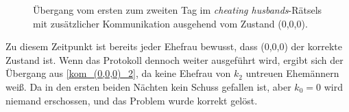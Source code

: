 \begin{figure}
	\caption{Übergang vom ersten zum zweiten Tag im \textit{cheating husbands}-Rätsels mit zusätzlicher Kommunikation ausgehend vom Zustand (0,0,0).}
	\label{kom_(0,0,0)_1}
\end{figure}

Zu diesem Zeitpunkt ist bereits jeder Ehefrau bewusst, dass (0,0,0) der korrekte Zustand ist. Wenn das Protokoll dennoch weiter ausgeführt wird, ergibt sich der Übergang aus \ref{kom_(0,0,0)_2}, da keine Ehefrau von $k_2$ untreuen Ehemännern weiß.
Da in den ersten beiden Nächten kein Schuss gefallen ist, aber $k_0 = 0$ wird niemand erschossen, und das Problem wurde korrekt gelöst.

